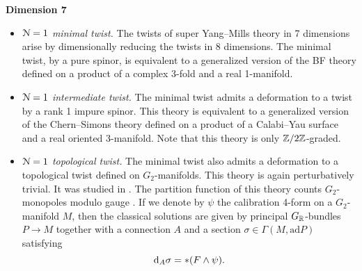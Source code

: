 \documentclass[10pt, oneside]{article}
\begin{document}
\textbf{Dimension 7}
\begin{itemize}
 \item \emph{$\mathcal{N}=1$ minimal twist.} The twists of super Yang--Mills theory in 7 dimensions arise by dimensionally reducing the twists in 8 dimensions.  The minimal twist, by a pure spinor, is equivalent to a generalized version of the BF theory defined on a product of a complex 3-fold and a real 1-manifold.
 \item \emph{$\mathcal{N}=1$ intermediate twist.} The minimal twist admits a deformation to a twist by a rank 1 impure spinor. This theory is equivalent to a generalized version of the Chern--Simons theory defined on a product of a Calabi--Yau surface and a real oriented 3-manifold. Note that this theory is only $\mathbb Z/2\mathbb Z$-graded.
 \item \emph{$\mathcal{N}=1$ topological twist.} The minimal twist also admits a deformation to a topological twist defined on $G_2$-manifolds. This theory is again perturbatively trivial. It was studied in \cite{AcharyaOLoughlinSpence, BaulieuKannoSinger}. The partition function of this theory counts $G_2$-monopoles modulo gauge \cite{DonaldsonSegal}. If we denote by $\psi$ the calibration 4-form on a $G_2$-manifold $M$, then the classical solutions are given by principal $G_\mathbb R$-bundles $P\rightarrow M$ together with a connection $A$ and a section $\sigma\in\Gamma(M, \mathrm{ad} P)$ satisfying
\begin{equation}
{\rm d}_A\sigma = \ast(F\wedge \psi).
\end{equation}
\end{itemize}
\end{document}
